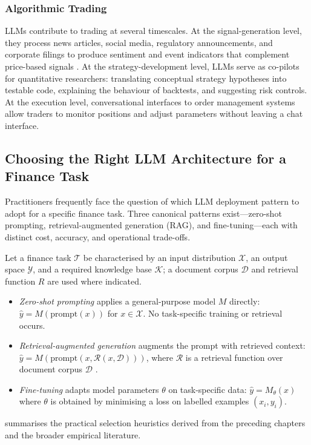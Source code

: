 \begin{context}
\subsubsection*{Algorithmic Trading}
LLMs contribute to trading at several timescales. At the signal-generation level, they process news articles, social media, regulatory announcements, and corporate filings to produce sentiment and event indicators that complement price-based signals \cite{LopezLiraTang2023}. At the strategy-development level, LLMs serve as co-pilots for quantitative researchers: translating conceptual strategy hypotheses into testable code, explaining the behaviour of backtests, and suggesting risk controls. At the execution level, conversational interfaces to order management systems allow traders to monitor positions and adjust parameters without leaving a chat interface.

\subsection{Choosing the Right LLM Architecture for a Finance Task}
\label{subsec:af-survey-architecture}

Practitioners frequently face the question of which LLM deployment pattern to adopt for a specific finance task. Three canonical patterns exist---zero-shot prompting, retrieval-augmented generation (RAG), and fine-tuning---each with distinct cost, accuracy, and operational trade-offs.

\begin{definition}
\label{def:deployment-patterns}
Let a finance task $\mathcal{T}$ be characterised by an input distribution $\mathcal{X}$, an output space $\mathcal{Y}$, and a required knowledge base $\mathcal{K}$; a document corpus $\mathcal{D}$ and retrieval function $R$ are used where indicated.
\begin{itemize}
  \item \emph{Zero-shot prompting} applies a general-purpose model $M$ directly: $\hat{y} = M(\text{prompt}(x))$ for $x \in \mathcal{X}$. No task-specific training or retrieval occurs.
  \item \emph{Retrieval-augmented generation} augments the prompt with retrieved context: $\hat{y} = M(\text{prompt}(x, \mathcal{R}(x, \mathcal{D})))$, where $\mathcal{R}$ is a retrieval function over document corpus $\mathcal{D}$ \cite{lewis2020rag}.
  \item \emph{Fine-tuning} adapts model parameters $\theta$ on task-specific data: $\hat{y} = M_\theta(x)$ where $\theta$ is obtained by minimising a loss on labelled examples $(x_i, y_i)$.
\end{itemize}
\end{definition}

 summarises the practical selection heuristics derived from the preceding chapters and the broader empirical literature.

\end{context}

